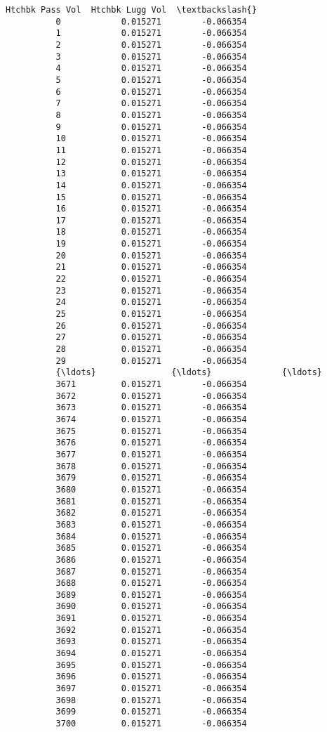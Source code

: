 \documentclass[11pt]{article}
\begin{document}
\begin{Verbatim}[commandchars=\\\{\}]
                Htchbk Pass Vol  Htchbk Lugg Vol  \textbackslash{}
          0            0.015271        -0.066354   
          1            0.015271        -0.066354   
          2            0.015271        -0.066354   
          3            0.015271        -0.066354   
          4            0.015271        -0.066354   
          5            0.015271        -0.066354   
          6            0.015271        -0.066354   
          7            0.015271        -0.066354   
          8            0.015271        -0.066354   
          9            0.015271        -0.066354   
          10           0.015271        -0.066354   
          11           0.015271        -0.066354   
          12           0.015271        -0.066354   
          13           0.015271        -0.066354   
          14           0.015271        -0.066354   
          15           0.015271        -0.066354   
          16           0.015271        -0.066354   
          17           0.015271        -0.066354   
          18           0.015271        -0.066354   
          19           0.015271        -0.066354   
          20           0.015271        -0.066354   
          21           0.015271        -0.066354   
          22           0.015271        -0.066354   
          23           0.015271        -0.066354   
          24           0.015271        -0.066354   
          25           0.015271        -0.066354   
          26           0.015271        -0.066354   
          27           0.015271        -0.066354   
          28           0.015271        -0.066354   
          29           0.015271        -0.066354   
          {\ldots}               {\ldots}              {\ldots}   
          3671         0.015271        -0.066354   
          3672         0.015271        -0.066354   
          3673         0.015271        -0.066354   
          3674         0.015271        -0.066354   
          3675         0.015271        -0.066354   
          3676         0.015271        -0.066354   
          3677         0.015271        -0.066354   
          3678         0.015271        -0.066354   
          3679         0.015271        -0.066354   
          3680         0.015271        -0.066354   
          3681         0.015271        -0.066354   
          3682         0.015271        -0.066354   
          3683         0.015271        -0.066354   
          3684         0.015271        -0.066354   
          3685         0.015271        -0.066354   
          3686         0.015271        -0.066354   
          3687         0.015271        -0.066354   
          3688         0.015271        -0.066354   
          3689         0.015271        -0.066354   
          3690         0.015271        -0.066354   
          3691         0.015271        -0.066354   
          3692         0.015271        -0.066354   
          3693         0.015271        -0.066354   
          3694         0.015271        -0.066354   
          3695         0.015271        -0.066354   
          3696         0.015271        -0.066354   
          3697         0.015271        -0.066354   
          3698         0.015271        -0.066354   
          3699         0.015271        -0.066354   
          3700         0.015271        -0.066354   
          

\end{Verbatim}
\end{document}
